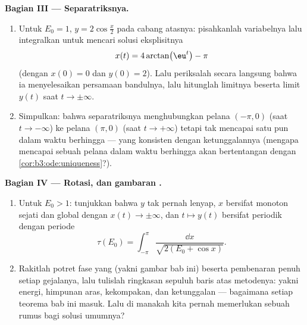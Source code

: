 \begin{problem}
\medskip
\noindent\textbf{Bagian III --- Separatriksnya.}
\begin{enumerate}[resume]
  \item Untuk $E_0 = 1$, $y = 2\cos\frac x2$ pada cabang
        atasnya: pisahkanlah variabelnya lalu integralkan untuk mencari
        solusi eksplisitnya
        \[
        x(t) = 4\arctan\bigl(\eu^{t}\bigr) - \pi
        \]
        (dengan $x(0) = 0$ dan $y(0) = 2$). Lalu periksalah secara langsung bahwa
        ia menyelesaikan persamaan bandulnya, lalu hitunglah limitnya beserta
        limit $y(t)$ saat $t \to
        \pm\infty$.
  \item Simpulkan: bahwa  separatriksnya menghubungkan pelana
        $(-\pi, 0)$ (saat $t \to -\infty$) ke pelana
        $(\pi, 0)$ (saat $t \to +\infty$) tetapi tak mencapai satu pun
        dalam waktu berhingga --- yang konsisten dengan ketunggalannya (mengapa
        mencapai sebuah pelana dalam waktu berhingga akan bertentangan dengan
        \cref{cor:b3:ode:uniqueness}?).
\end{enumerate}

\medskip
\noindent\textbf{Bagian IV --- Rotasi, dan gambaran
.}
\begin{enumerate}[resume]
  \item Untuk $E_0 > 1$: tunjukkan bahwa $y$ tak pernah lenyap, $x$ bersifat
        monoton sejati dan global dengan $x(t) \to
        \pm\infty$, dan $t \mapsto y(t)$ bersifat periodik dengan
        periode
        \[
        \tau(E_0) = \int_{-\pi}^{\pi}
        \frac{\dd x}{\sqrt{2(E_0 + \cos x)}} .
        \]
  \item Rakitlah potret fase yang  (yakni gambar bab ini)
        beserta pembenaran penuh setiap gejalanya, lalu
        tulislah ringkasan sepuluh baris atas metodenya: yakni energi,
        himpunan aras, kekompakan, dan ketunggalan --- bagaimana setiap
        teorema bab ini masuk. Lalu di manakah kita pernah memerlukan sebuah rumus bagi solusi umumnya?
\end{enumerate}


\end{problem}
